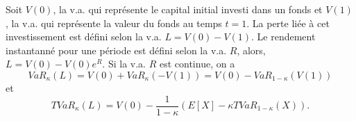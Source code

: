\begin{definition}{}{}
	Soit $V(0)$, la v.a. qui représente le capital initial investi dans un fonds et $V(1)$, la v.a. qui représente la valeur du fonds au temps $t = 1$. La perte liée à cet investissement est défini selon la v.a. $L = V(0) - V(1)$. Le rendement instantanné pour une période est défini selon la v.a. $R$, alors, $L = V(0) - V(0)e^R$. Si la v.a. $R$ est continue, on a 
	$$VaR_\kappa(L) = V(0) + VaR_\kappa(-V(1)) = V(0) - VaR_{1 - \kappa}(V(1))$$
	et
	$$TVaR_\kappa(L) = V(0) - \frac{1}{1 - \kappa} \left(E[X]-\kappa TVaR_{1 - \kappa}(X)\right).$$
\end{definition}
















































